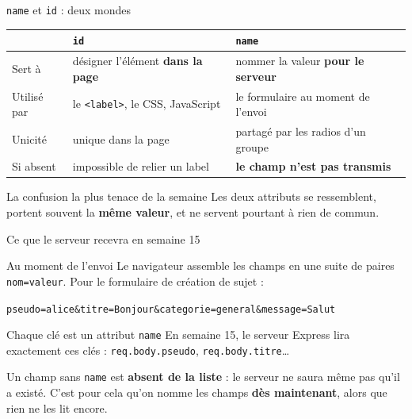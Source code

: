 \documentclass[aspectratio=169,11pt]{beamer}
\newcommand{\hdr}[1]{\multicolumn{1}{l}{\color{white}\bfseries #1}}
\begin{document}
\begin{frame}{\texttt{name} et \texttt{id} : deux mondes}
  \begin{center}
  \small
  \begin{tabularx}{\textwidth}{lXX}
    \toprule
    \rowcolor{accentBlue}
    \hdr{} & \hdr{\texttt{id}} & \hdr{\texttt{name}} \\
    \midrule
    \rowcolor{cfptGrey}
    Sert à & désigner l'élément \textbf{dans la page} & nommer la valeur \textbf{pour le serveur} \\
    Utilisé par & le \texttt{<label>}, le CSS, JavaScript & le formulaire au moment de l'envoi \\
    \rowcolor{cfptGrey}
    Unicité & unique dans la page & partagé par les radios d'un groupe \\
    Si absent & impossible de relier un label & \textbf{le champ n'est pas transmis} \\
    \bottomrule
  \end{tabularx}
  \end{center}
  \vspace{0.3cm}
  \begin{alertblock}{La confusion la plus tenace de la semaine}
    Les deux attributs se ressemblent, portent souvent la \textbf{même valeur}, et ne servent pourtant à rien de commun.
  \end{alertblock}
\end{frame}

\begin{frame}{Ce que le serveur recevra en semaine 15}
  \begin{block}{Au moment de l'envoi}
    Le navigateur assemble les champs en une suite de paires \texttt{nom=valeur}. Pour le formulaire de création de sujet :
    \vspace{0.2cm}

    \begin{center}
      \texttt{\small pseudo=alice\&titre=Bonjour\&categorie=general\&message=Salut}
    \end{center}
  \end{block}
  \vspace{0.2cm}
  \begin{exampleblock}{Chaque clé est un attribut \texttt{name}}
    En semaine 15, le serveur Express lira exactement ces clés : \texttt{req.body.pseudo}, \texttt{req.body.titre}\ldots
    \vspace{0.15cm}

    Un champ sans \texttt{name} est \textbf{absent de la liste} : le serveur ne saura même pas qu'il a existé. C'est pour cela qu'on nomme les champs \textbf{dès maintenant}, alors que rien ne les lit encore.
  \end{exampleblock}
\end{frame}
\end{document}
